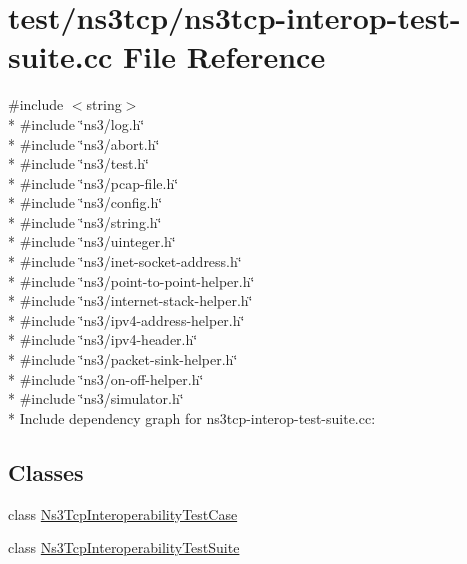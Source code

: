\hypertarget{ns3tcp-interop-test-suite_8cc}{}\section{test/ns3tcp/ns3tcp-\/interop-\/test-\/suite.cc File Reference}
\label{ns3tcp-interop-test-suite_8cc}
{\ttfamily \#include $<$string$>$}\\*
{\ttfamily \#include \char`\"{}ns3/log.\+h\char`\"{}}\\*
{\ttfamily \#include \char`\"{}ns3/abort.\+h\char`\"{}}\\*
{\ttfamily \#include \char`\"{}ns3/test.\+h\char`\"{}}\\*
{\ttfamily \#include \char`\"{}ns3/pcap-\/file.\+h\char`\"{}}\\*
{\ttfamily \#include \char`\"{}ns3/config.\+h\char`\"{}}\\*
{\ttfamily \#include \char`\"{}ns3/string.\+h\char`\"{}}\\*
{\ttfamily \#include \char`\"{}ns3/uinteger.\+h\char`\"{}}\\*
{\ttfamily \#include \char`\"{}ns3/inet-\/socket-\/address.\+h\char`\"{}}\\*
{\ttfamily \#include \char`\"{}ns3/point-\/to-\/point-\/helper.\+h\char`\"{}}\\*
{\ttfamily \#include \char`\"{}ns3/internet-\/stack-\/helper.\+h\char`\"{}}\\*
{\ttfamily \#include \char`\"{}ns3/ipv4-\/address-\/helper.\+h\char`\"{}}\\*
{\ttfamily \#include \char`\"{}ns3/ipv4-\/header.\+h\char`\"{}}\\*
{\ttfamily \#include \char`\"{}ns3/packet-\/sink-\/helper.\+h\char`\"{}}\\*
{\ttfamily \#include \char`\"{}ns3/on-\/off-\/helper.\+h\char`\"{}}\\*
{\ttfamily \#include \char`\"{}ns3/simulator.\+h\char`\"{}}\\*
Include dependency graph for ns3tcp-\/interop-\/test-\/suite.cc\+:
\subsection*{Classes}
\begin{DoxyCompactItemize}
\item 
class \hyperlink{classNs3TcpInteroperabilityTestCase}{Ns3\+Tcp\+Interoperability\+Test\+Case}
\item 
class \hyperlink{classNs3TcpInteroperabilityTestSuite}{Ns3\+Tcp\+Interoperability\+Test\+Suite}
\end{DoxyCompactItemize}
